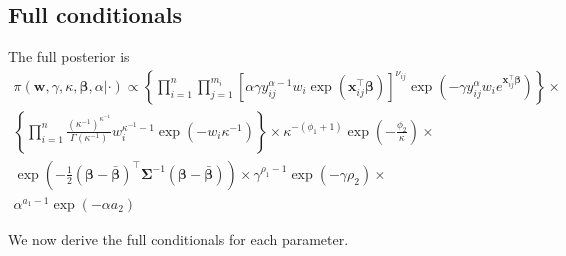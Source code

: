 \documentclass[12pt]{article}
\newcommand{\m}[1]{\mathbf{\bm{#1}}}
\begin{document}
\subsection*{Full conditionals}

\noindent The full posterior is
\begin{eqnarray*}
\pi(\m{w},\gamma,\kappa,\m{\beta},\alpha|\cdot) \propto \left\{\prod_{i=1}^n \prod_{j=1}^{m_i} \left[\alpha\gamma y_{ij}^{\alpha-1}w_i\exp(\m{x}_{ij}^\top\m{\beta})\right]^{\nu_{ij}} \exp\left(-\gamma y_{ij}^\alpha w_ie^{\m{x}_{ij}^\top\m{\beta}}\right)\right\} \times \\
\left\{\prod_{i=1}^n \frac{(\kappa^{-1})^{\kappa^{-1}}}{\Gamma(\kappa^{-1})}w_i^{\kappa^{-1}-1}\exp(-w_i\kappa^{-1})\right\} \times \kappa^{-(\phi_1+1)}\exp\left(-\frac{\phi_2}{\kappa}\right) \times \\
\exp\left(-\frac{1}{2}(\m{\beta}-\bar{\m{\beta}})^\top\m{\Sigma}^{-1}(\m{\beta}-\bar{\m{\beta}})\right) \times \gamma^{\rho_1-1}\exp\left(-\gamma\rho_2\right) \times \\
\alpha^{a_1-1}\exp\left(-\alpha a_2\right)
\end{eqnarray*}

\noindent We now derive the full conditionals for each parameter.
\end{document}
